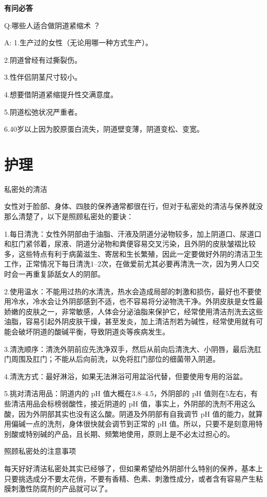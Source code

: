 \documentclass[12pt,UTF8]{ctexbook}
\begin{document}
\textbf{有问必答}

Q:哪些人适合做阴道紧缩术 ？

A:
1.生产过的女性（无论用哪一种方式生产）。

2.阴道曾经有过撕裂伤。

3.性伴侣阴茎尺寸较小。

4.想要借阴道紧缩提升性交满意度。

5.阴道松弛状况严重者。

6.40岁以上因为胶原蛋白流失，阴道壁变薄，阴道变松、变宽。

\section{护理}

私密处的清洁

女性对于脸部、身体、四肢的保养通常都很在行，但对于私密处的清洁与保养就没那么清楚了，以下是照顾私密处的要诀：

1.每日清洗：女性外阴部由于油脂、汗液及阴道分泌物较多，加上阴道口、尿道口和肛门紧邻着，尿液、阴道分泌物和粪便容易交叉污染，且外阴的皮肤皱褶比较多，这些特点有利于病菌滋生、寄居和生长繁殖，因此一定要做好外阴的清洁卫生工作，正常情况下每日清洗1--2次，在做爱前尤其必要再清洗一次，因为男人口交时会一再重复舔舐女人的阴部。

2.使用温水：不能用过热的水清洗，热水会造成局部的刺激和损伤，最好也不要使用冷水，冷水会让外阴部感到不适，也不容易将分泌物洗干净。外阴皮肤是女性最娇嫩的皮肤之一，非常敏感，人体会分泌油脂来保护它，经常使用清洁剂洗去这些油脂，容易引起外阴皮肤干燥，甚至发炎，加上清洁剂若为碱性，经常使用就有可能会破坏阴道的酸碱平衡，导致阴道炎等疾病发生。

3.清洗顺序：清洗外阴前应先洗净双手，然后从前向后清洗大、小阴唇，最后洗肛门周围及肛门；不能从后向前洗，以免将肛门部位的细菌带入阴道。

4.清洗方式：最好淋浴，如果无法淋浴可用盆浴代替，但要使用专用的浴盆。

5.挑对清洁用品：阴道内的 pH 值大概在3.8--4.5，外阴部的 pH 值则在5左右，有些清洁用品会标榜弱酸性，接近阴道的 pH 值，事实上，外阴部的洗剂不用这么酸，因为外阴部其实也没有这么酸。阴道及外阴部有自我调节 pH 值的能力，就算用偏碱一点的洗剂，身体很快就会调节到正常的 pH 值。所以，只要不是刻意用特别酸或特别碱的产品，且长期、频繁地使用，原则上是不必太过担心的。

照顾私密处的注意事项

每天好好清洁私密处其实已经够了，但如果希望给外阴部什么特别的保养，基本上只要挑选成分不要太花俏，不要有香精、色素、刺激性成分，或者含有容易产生粘膜刺激性防腐剂的产品就可以了。
\end{document}

